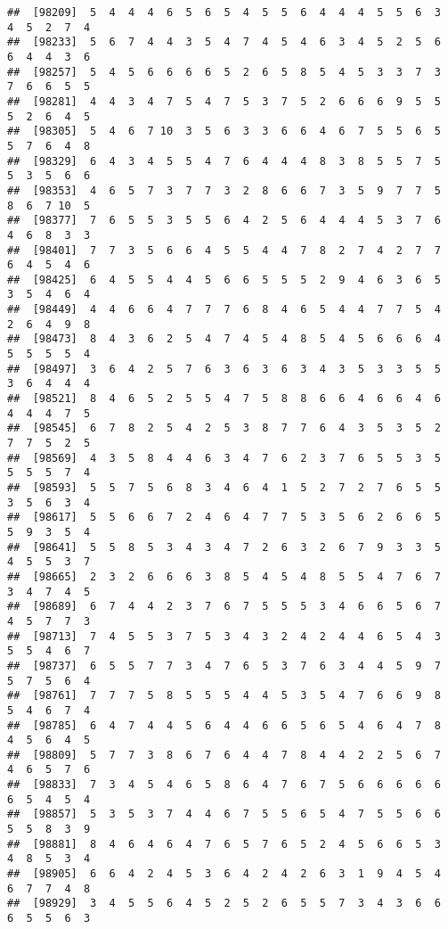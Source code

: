 \documentclass[
]{book}
\begin{document}
\begin{verbatim}
##  [98209]  5  4  4  4  6  5  6  5  4  5  5  6  4  4  4  5  5  6  3  4  5  2  7  4
##  [98233]  5  6  7  4  4  3  5  4  7  4  5  4  6  3  4  5  2  5  6  6  4  4  3  6
##  [98257]  5  4  5  6  6  6  6  5  2  6  5  8  5  4  5  3  3  7  3  7  6  6  5  5
##  [98281]  4  4  3  4  7  5  4  7  5  3  7  5  2  6  6  6  9  5  5  5  2  6  4  5
##  [98305]  5  4  6  7 10  3  5  6  3  3  6  6  4  6  7  5  5  6  5  5  7  6  4  8
##  [98329]  6  4  3  4  5  5  4  7  6  4  4  4  8  3  8  5  5  7  5  5  3  5  6  6
##  [98353]  4  6  5  7  3  7  7  3  2  8  6  6  7  3  5  9  7  7  5  8  6  7 10  5
##  [98377]  7  6  5  5  3  5  5  6  4  2  5  6  4  4  4  5  3  7  6  4  6  8  3  3
##  [98401]  7  7  3  5  6  6  4  5  5  4  4  7  8  2  7  4  2  7  7  6  4  5  4  6
##  [98425]  6  4  5  5  4  4  5  6  6  5  5  5  2  9  4  6  3  6  5  3  5  4  6  4
##  [98449]  4  4  6  6  4  7  7  7  6  8  4  6  5  4  4  7  7  5  4  2  6  4  9  8
##  [98473]  8  4  3  6  2  5  4  7  4  5  4  8  5  4  5  6  6  6  4  5  5  5  5  4
##  [98497]  3  6  4  2  5  7  6  3  6  3  6  3  4  3  5  3  3  5  5  3  6  4  4  4
##  [98521]  8  4  6  5  2  5  5  4  7  5  8  8  6  6  4  6  6  4  6  4  4  4  7  5
##  [98545]  6  7  8  2  5  4  2  5  3  8  7  7  6  4  3  5  3  5  2  7  7  5  2  5
##  [98569]  4  3  5  8  4  4  6  3  4  7  6  2  3  7  6  5  5  3  5  5  5  5  7  4
##  [98593]  5  5  7  5  6  8  3  4  6  4  1  5  2  7  2  7  6  5  5  3  5  6  3  4
##  [98617]  5  5  6  6  7  2  4  6  4  7  7  5  3  5  6  2  6  6  5  5  9  3  5  4
##  [98641]  5  5  8  5  3  4  3  4  7  2  6  3  2  6  7  9  3  3  5  4  5  5  3  7
##  [98665]  2  3  2  6  6  6  3  8  5  4  5  4  8  5  5  4  7  6  7  3  4  7  4  5
##  [98689]  6  7  4  4  2  3  7  6  7  5  5  5  3  4  6  6  5  6  7  4  5  7  7  3
##  [98713]  7  4  5  5  3  7  5  3  4  3  2  4  2  4  4  6  5  4  3  5  5  4  6  7
##  [98737]  6  5  5  7  7  3  4  7  6  5  3  7  6  3  4  4  5  9  7  5  7  5  6  4
##  [98761]  7  7  7  5  8  5  5  5  4  4  5  3  5  4  7  6  6  9  8  5  4  6  7  4
##  [98785]  6  4  7  4  4  5  6  4  4  6  6  5  6  5  4  6  4  7  8  4  5  6  4  5
##  [98809]  5  7  7  3  8  6  7  6  4  4  7  8  4  4  2  2  5  6  7  4  6  5  7  6
##  [98833]  7  3  4  5  4  6  5  8  6  4  7  6  7  5  6  6  6  6  6  6  5  4  5  4
##  [98857]  5  3  5  3  7  4  4  6  7  5  5  6  5  4  7  5  5  6  6  5  5  8  3  9
##  [98881]  8  4  6  4  6  4  7  6  5  7  6  5  2  4  5  6  6  5  3  4  8  5  3  4
##  [98905]  6  6  4  2  4  5  3  6  4  2  4  2  6  3  1  9  4  5  4  6  7  7  4  8
##  [98929]  3  4  5  5  6  4  5  2  5  2  6  5  5  7  3  4  3  6  6  6  5  5  6  3

\end{verbatim}
\end{document}
